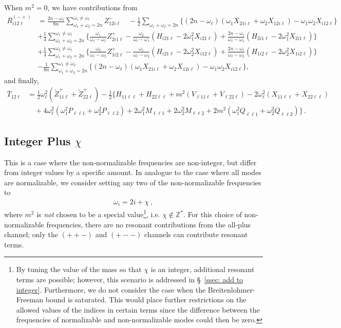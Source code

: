\documentclass[letterpaper,11pt]{article}
\newcommand{\oi}{\omega_i}
\newcommand{\ol}{\omega_\ell}
\newcommand{\oone}{\omega_1}
\newcommand{\otwo}{\omega_2}
\begin{document}
When $m^2 = 0$, we have contributions from
\begin{align}
\label{R3}
\overline{R}_{i12\ell}^{(-+)} &= \frac{2n-\ol}{8n} \sum_{\oone + \otwo = 2n}^{\oi \neq \ol} Z^-_{12i\ell} \quad - \frac{1}{2} \sum_{\oone + \otwo = 2n} \Big\{ (2n - \ol)\left(\oone X_{21i\ell} + \otwo X_{12i\ell} \right) - \oone \otwo X_{i12\ell} \Big\} \nonumber \\
%
& + \frac{1}{4} \sum_{\oone + \otwo = 2n}^{\oone \neq \ol} \Big\{ \frac{\oone}{\ol - \oone} Z^+_{2i1\ell} - \frac{\otwo}{\ol - \oone} \left(H_{i21\ell} - 2\oone^2 X_{i21\ell} \right) + \frac{2n - \ol}{\ol - \oone} \left( H_{2i1\ell} - 2\oone^2 X_{2i1\ell} \right) \Big\} \nonumber \\
%
& + \frac{1}{4} \sum_{\oone + \otwo = 2n}^{\otwo \neq \ol} \Big\{ \frac{\otwo}{\ol-\otwo} Z^+_{1i2\ell} - \frac{\oone}{\ol-\otwo}\left(H_{i21\ell} - 2\otwo^2 X_{i12\ell} \right) + \frac{2n - \ol}{\ol - \otwo} \left( H_{1i2\ell} - 2\otwo^2 X_{1i2\ell} \right) \Big\} \nonumber \\
%
& - \frac{1}{8n} \sum_{\oone + \otwo = 2n}^{\oone \neq \otwo} \Big\{ (2n - \ol) \left(\oone X_{21i\ell} + \otwo X_{12i\ell} \right) - \oone \otwo X_{i12\ell} \Big\} ,
\end{align}
and finally, 
\begin{align}
\label{T12}
\overline{T}_{12\ell} &=  \frac{1}{2} \ol^2 \left( \tilde{Z}^+_{11\ell} + \tilde{Z}^+_{22\ell} \right)- \frac{1}{2} \Big\{ H_{11\ell\ell} + H_{22\ell\ell} + m^2 \left( V_{\ell 1 1 \ell} + V_{\ell 2 2 \ell} \right) - 2 \ol^2 \left( X_{11\ell\ell} + X_{22\ell\ell} \right)  \nonumber \\
%
& \quad + 4 \ol^2 \left( \oone^2 P_{\ell \ell 1} + \otwo^2 P_{\ell \ell 2} \right) + 2\oone^2 M_{\ell \ell 1} + 2\otwo^2 M_{\ell \ell 2} + 2m^2 \left( \oone^2 Q_{\ell\ell 1} + \otwo^2 Q_{\ell \ell 2} \right) \Big\} \, .
\end{align}

\subsection{Integer Plus $\chi$}

This is a case where the non-normalizable frequencies are non-integer, but differ from integer values by a specific amount. In analogue to the case where all modes are normalizable, we consider setting any two of the non-normalizable frequencies to
\begin{align}
\oi = 2i + \chi \, ,
\end{align}
where $m^2$ is \emph{not} chosen to be a special value\footnote{By tuning the value of the mass so that $\chi$ is an integer, additional resonant terms are possible; however, this scenario is addressed in \S\!~\ref{ssec: add to integer}. Furthermore, we do not consider the case when the Breitenlohmer-Freeman bound is saturated. This would place further restrictions on the allowed values of the indices in certain terms since the difference between the frequencies of normalizable and non-normalizable modes could then be zero.}, i.e. $\chi \notin \mathbb{Z}^*$. For this choice of non-normalizable frequencies, there are no resonant contributions from the all-plus channel; only the $(++-)$ and $(+--)$ channels can contribute resonant terms.
\end{document}
